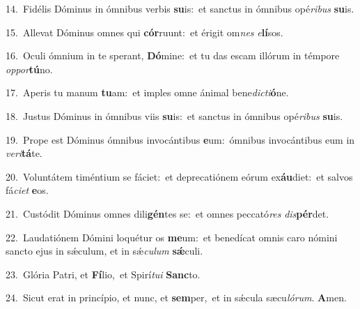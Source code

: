 {\numbfont\textcolor{\numbcolor}{14.}}~Fidélis Dóminus in ómnibus verbis \textbf{su}\-is:~\star et sanctus in ómnibus opé\-\textit{ri}\-\textit{bus} \textbf{su}\-is.\par
{\numbfont\textcolor{\numbcolor}{15.}}~Allevat Dóminus omnes qui \textbf{cór}\-ruunt:~\star et érigit om\textit{nes} \textit{e}\-\textbf{lí}sos.\par
{\numbfont\textcolor{\numbcolor}{16.}}~Oculi ómnium in te sperant, \textbf{Dó}\-mine:~\star et tu das escam illórum in témpore \textit{op}\-\textit{por}\textbf{tú}no.\par
{\numbfont\textcolor{\numbcolor}{17.}}~Aperis tu manum \textbf{tu}\-am:~\star et imples omne ánimal bene\-\textit{dic}\-\textit{ti}\textbf{ó}ne.\par
{\numbfont\textcolor{\numbcolor}{18.}}~Justus Dóminus in ómnibus viis \textbf{su}\-is:~\star et sanctus in ómnibus opé\-\textit{ri}\-\textit{bus} \textbf{su}\-is.\par
{\numbfont\textcolor{\numbcolor}{19.}}~Prope est Dóminus ómnibus invocántibus \textbf{e}\-um:~\star ómnibus invocántibus eum in \textit{ve}\-\textit{ri}\textbf{tá}te.\par
{\numbfont\textcolor{\numbcolor}{20.}}~Voluntátem timéntium se fáciet:~\dagger et deprecatiónem eórum ex\-\textbf{áu}\-diet:~\star et salvos fá\-\textit{ci}\-\textit{et} \textbf{e}\-os.\par
{\numbfont\textcolor{\numbcolor}{21.}}~Custódit Dóminus omnes dili\-\textbf{gén}\-tes se:~\star et omnes peccató\textit{res} \textit{dis}\-\textbf{pér}det.\par
{\numbfont\textcolor{\numbcolor}{22.}}~Laudatiónem Dómini loquétur os \textbf{me}\-um:~\star et benedícat omnis caro nómini sancto ejus in sǽculum, et in sǽ\-\textit{cu}\-\textit{lum} \textbf{sǽ}\-culi.\par
{\numbfont\textcolor{\numbcolor}{23.}}~Glória Patri, et \textbf{Fí}\-lio,~\star et Spirí\-\textit{tu}\-\textit{i} \textbf{Sanc}\-to.\par
{\numbfont\textcolor{\numbcolor}{24.}}~Sicut erat in princípio, et nunc, et \textbf{sem}\-per,~\star et in sǽcula sæcu\-\textit{ló}\-\textit{rum}. \textbf{A}\-men.\par
